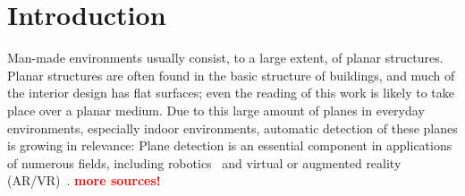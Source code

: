 \documentclass[main.tex]{subfiles}
\begin{document}
\chapter{Introduction}
\label{chap:Introduction}

Man-made environments usually consist, to a large extent, of planar structures. 
Planar structures are often found in the basic structure of buildings, and much of the interior design has flat surfaces; 
even the reading of this work is likely to take place over a planar medium. 
Due to this large amount of planes in everyday environments, especially indoor environments, automatic detection of these planes is growing in relevance: 
Plane detection is an essential component in applications of numerous fields, including robotics~\cite{Zhang_Wang_Xianyu_Ziwei_Wei_2019}
and virtual or augmented reality (AR/VR)~\cite{Jurado_Jurado_Ortega_Feito_2021}. \textbf{\textcolor{red}{more sources!}}
\end{document}
